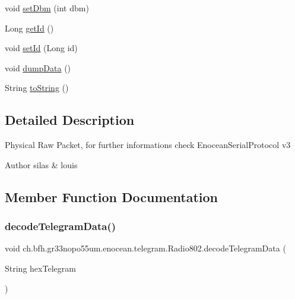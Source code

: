 \begin{DoxyCompactItemize}
\item 
void \hyperlink{classch_1_1bfh_1_1gr33nopo55um_1_1enocean_1_1telegram_1_1_radio802_a61daed880fd7c6f5cfc9d13d11225c9f}{set\+Dbm} (int dbm)
\item 
Long \hyperlink{classch_1_1bfh_1_1gr33nopo55um_1_1enocean_1_1telegram_1_1_radio802_a912e19d8c60b78b03fca8b9292e56cec}{get\+Id} ()
\item 
void \hyperlink{classch_1_1bfh_1_1gr33nopo55um_1_1enocean_1_1telegram_1_1_radio802_a03783741059d9572ad0604182df23d1d}{set\+Id} (Long id)
\item 
void \hyperlink{classch_1_1bfh_1_1gr33nopo55um_1_1enocean_1_1telegram_1_1_radio802_aae7fc0aee7c0006a0cacd696e2737024}{dump\+Data} ()
\item 
String \hyperlink{classch_1_1bfh_1_1gr33nopo55um_1_1enocean_1_1telegram_1_1_radio802_a7861ad2051e04fe165d9a18e334e86ff}{to\+String} ()
\end{DoxyCompactItemize}


\subsection{Detailed Description}
Physical Raw Packet, for further informations check Enocean\+Serial\+Protocol v3

\begin{DoxyAuthor}{Author}
silas \& louis 
\end{DoxyAuthor}


\subsection{Member Function Documentation}
\hypertarget{classch_1_1bfh_1_1gr33nopo55um_1_1enocean_1_1telegram_1_1_radio802_a36a30df4b04981aa53be8481b9f0072a}{}\label{classch_1_1bfh_1_1gr33nopo55um_1_1enocean_1_1telegram_1_1_radio802_a36a30df4b04981aa53be8481b9f0072a} 
\subsubsection{\texorpdfstring{decode\+Telegram\+Data()}{decodeTelegramData()}}
{\footnotesize\ttfamily void ch.\+bfh.\+gr33nopo55um.\+enocean.\+telegram.\+Radio802.\+decode\+Telegram\+Data (\begin{DoxyParamCaption}\item[{String}]{hex\+Telegram }\end{DoxyParamCaption})}

